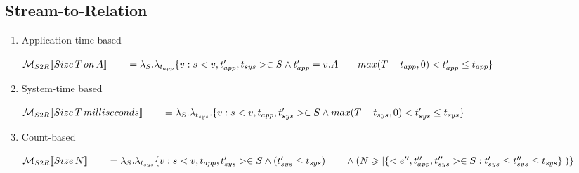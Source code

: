 \subsection*{Stream-to-Relation}
\begin{enumerate}
	\item Application-time based
	
	$\mathcal{M}_{S2R}[\![Size\, T\, on\, A]\!] \\
		{}\qquad= \lambda_S.\lambda_{t_{app}}\{v:  s<v,t_{app}',t_{sys}> \in S  \land t'_{app} = v.A \\
		{}\qquad max(T-t_{app},0) < t'_{app} \leq t_{app} \}$ 
		
	\item System-time based
	
	$\mathcal{M}_{S2R}[\![Size\, T\, milliseconds]\!] \\
		{}\qquad= \lambda_S.\lambda_{t_{sys}}.\{v:  s<v,t_{app},t'_{sys}> \in S  \land 
		max(T-t_{sys},0) < t'_{sys} \leq t_{sys} \}$ 
		
	\item Count-based
	
	$\mathcal{M}_{S2R}[\![Size\, N]\!] \\
		{}\qquad= \lambda_S.\lambda_{t_{sys}}\{v:  s<v,t_{app},t'_{sys}> \in S  \land (t'_{sys} \leq t_{sys}) \\
		{}\qquad \land (N \geqslant |\{<e'',t''_{app},t''_{sys}> \in S: t'_{sys} \leq t''_{sys} \leq t_{sys}\}|) \}$
\end{enumerate}

